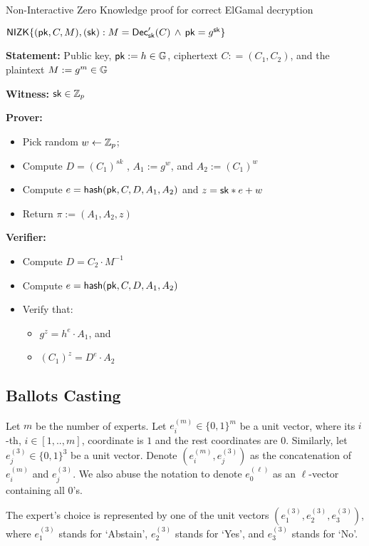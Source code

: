 \begin{boxfig}{\label{fig:ElgamalDecrNIZK}Non-Interactive Zero Knowledge proof for correct ElGamal decryption}{}
\begin{center}
$\mathsf{NIZK}\{(\mathsf{pk}, C, M ),(\mathsf{sk}): M = \mathsf{Dec}'_{\mathsf{sk}}(C) \, \wedge \, \mathsf{pk} = g^{\mathsf{sk}}\}$
\end{center}

\textbf{Statement:} Public key, $\mathsf{pk}:=h \in\mathbb{G}$,  ciphertext $C: =(C_1, C_2 )$, and the plaintext $M:=g^m \in\mathbb{G}$

\textbf{Witness:} $\mathsf{sk}\in\mathbb{Z}_p$

\medskip
\textbf{Prover:}
\begin{itemize}
\item Pick random $w \leftarrow  {\mathbb{Z}_p}$; 
\item Compute $D=(C_1)^{sk}$ , $A_1 := g^w$, and $A_2 := (C_1)^w $
\item Compute $e = \mathsf{hash}(\mathsf{pk},C,D,A_1,A_2)$ and  $ z = \mathsf{sk}*e + w$
\item Return $\pi:=(A_1,A_2,z)$
\end{itemize}

\textbf{Verifier:}
\begin{itemize}
\item Compute $D=C_2 \cdot M^{-1}$
\item Compute $e = \mathsf{hash}(\mathsf{pk},C,D,A_1,A_2)$
\item Verify that:
    \begin{itemize}
    \item $g^z = h^e \cdot A_1$, and
    \item $(C_1)^{z} = D^e \cdot A_2$ 
    \end{itemize}
\end{itemize}
\end{boxfig}

\FloatBarrier
\subsection{Ballots Casting}

Let $m$ be the number of experts. Let $e^{(m)}_i \in \{0,1\}^{m}$ be a unit vector, where its $i$-th, $i \in [1,..,m]$, coordinate is $1$ and the rest coordinates are $0$. Similarly, let  $e^{(3)}_j \in \{0,1\}^{3}$ be a unit vector. Denote $( e^{(m)}_i , e^{(3)}_j )$ as the concatenation of $e^{(m)}_i $ and $e^{(3)}_j$.  We also abuse the notation to denote  $e^{(\ell)}_0$ as an $\ell$-vector containing all $0$'s.  

The expert's choice  is represented by one of the unit vectors $(e^{(3)}_1, e^{(3)}_2, e^{(3)}_3)$, where $e^{(3)}_1$ stands for `Abstain', $e^{(3)}_2$ stands for `Yes', and $e^{(3)}_3$ stands for `No'.

